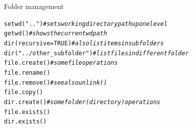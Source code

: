 \documentclass[xcolor=table,       handout,    xcolor=dvipsnames]{beamer}\usepackage[]{graphicx}\usepackage[]{color}
\makeatletter
\newcommand{\hlnum}[1]{\textcolor[rgb]{0,0,0}{#1}}
\newcommand{\hlstr}[1]{\textcolor[rgb]{0.545,0.137,0.137}{#1}}
\newcommand{\hlcom}[1]{\textcolor[rgb]{0,0.392,0}{\textit{#1}}}
\newcommand{\hlstd}[1]{\textcolor[rgb]{0,0,0}{#1}}
\newcommand{\hlkwc}[1]{\textcolor[rgb]{1,0,1}{#1}}
\newcommand{\hlkwd}[1]{\textcolor[rgb]{0,0,1}{#1}}
\newenvironment{kframe}{%
 \def\at@end@of@kframe{}%
 \ifinner\ifhmode%
  \def\at@end@of@kframe{\end{minipage}}%
  \begin{minipage}{\columnwidth}%
 \fi\fi%
 \def\FrameCommand##1{\hskip\@totalleftmargin \hskip-\fboxsep
 \colorbox{shadecolor}{##1}\hskip-\fboxsep
     \hskip-\linewidth \hskip-\@totalleftmargin \hskip\columnwidth}%
 \MakeFramed {\advance\hsize-\width
   \@totalleftmargin\z@ \linewidth\hsize
   \@setminipage}}%
 {\par\unskip\endMakeFramed%
 \at@end@of@kframe}
\newenvironment{knitrout}{}{} %
\makeatother
\begin{document}

\begin{frame}[fragile]{Folder management}
\begin{knitrout}
\color{fgcolor}\begin{kframe}
\begin{alltt}
\hlkwd{setwd}\hlstd{(}\hlstr{".."}\hlstd{)} \hlcom{# sets working directory path up one level}
\hlkwd{getwd}\hlstd{()} \hlcom{# shows the current wd path}
\hlkwd{dir}\hlstd{(}\hlkwc{recursive}\hlstd{=}\hlnum{TRUE}\hlstd{)} \hlcom{# also list items in subfolders}
\hlkwd{dir}\hlstd{(}\hlstr{"../other_subfolder"}\hlstd{)} \hlcom{# list files in different folder}
\hlkwd{file.create}\hlstd{()} \hlcom{# some file operations}
\hlkwd{file.rename}\hlstd{()}
\hlkwd{file.remove}\hlstd{()} \hlcom{# see also unlink()}
\hlkwd{file.copy}\hlstd{()}
\hlkwd{dir.create}\hlstd{()} \hlcom{# some folder (directory) operations}
\hlkwd{file.exists}\hlstd{()}
\hlkwd{dir.exists}\hlstd{()}
\end{alltt}
\end{kframe}
\end{knitrout}
\end{frame}

\end{document}
